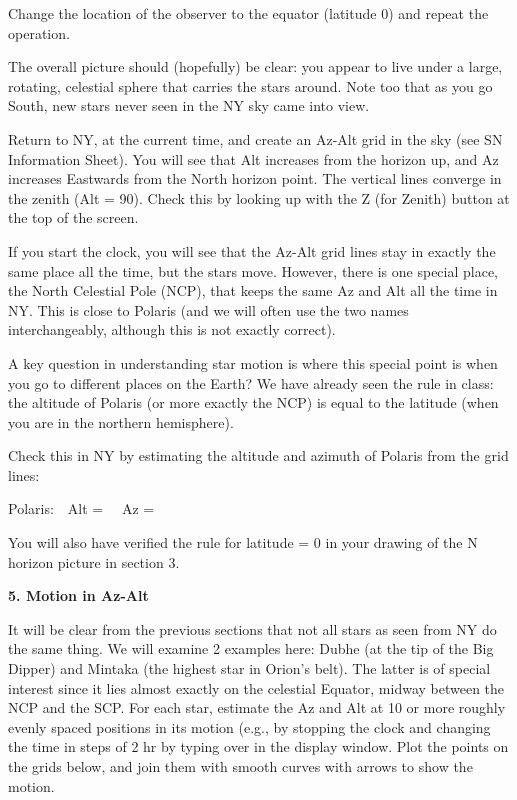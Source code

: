 \noindent
Change the location of the observer to the equator (latitude 0\deg)
and repeat the operation.


        \begin{figure*}[h]
        \centerline{}
        \caption{}
         \end{figure*}



The overall picture should (hopefully) be clear: you appear to live
under a large, rotating, celestial sphere that carries the stars
around. Note too that as you go South, new stars never seen in the NY
sky came into view.

 
\bigskip
\noindent

\newpage
{}

\medskip
\noindent
Return to NY, at the current time, and create an Az-Alt grid in the sky
(see SN Information Sheet).  You will see that
Alt increases from the horizon up, and Az increases Eastwards from the
North horizon point. The vertical lines converge in the zenith (Alt =
90\deg). Check this by looking up with the Z (for Zenith) button at the
top of the screen.

If you start the clock, you will see that the Az-Alt
grid lines stay in exactly the same place all the time, but the stars
move. However, there is one special place, the North Celestial Pole
(NCP), that keeps the same Az and Alt all the time in NY. This is
close to Polaris (and we will often use the two names interchangeably,
although this is not exactly correct).

A key question in understanding star motion is where this special
point is when you go to different places on the Earth?  We have
already seen the rule in class: the altitude of Polaris (or more
exactly the NCP) is equal to the latitude (when you are in the northern
hemisphere).

\bigskip
Check this in NY by estimating the altitude and azimuth of Polaris
from the grid lines:
\bigskip

Polaris:\ \ Alt = \makebox[4cm]{\hrulefill} \ \ Az =  \makebox[4cm]{\hrulefill}

\bigskip
You will also have verified the rule for latitude = 0 in your drawing
of the N horizon picture in section 3.

\vspace{4cm}
\bigskip\noindent
\clearpage
{\bf 5. Motion in Az-Alt}

\medskip\noindent
It will be clear from the previous sections that not all stars as seen
from NY do the same thing. We will examine 2 examples here: Dubhe (at
the tip of the Big Dipper) and Mintaka (the highest star in Orion's
belt). The latter is of special interest since it lies almost exactly
on the celestial Equator, midway between the NCP and the SCP.  For
each star, estimate the Az and Alt at 10 or more roughly evenly spaced
positions in its motion (e.g., by stopping the clock and changing the
time in steps of 2 hr by typing over in the display window. Plot the
points on the grids below, and join them with smooth curves with
arrows to show the motion.


